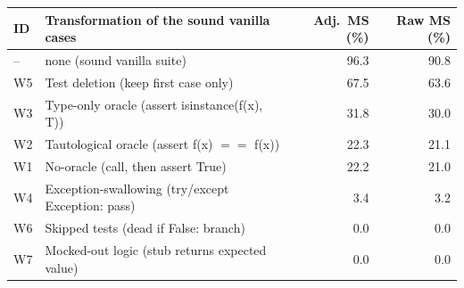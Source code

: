 \begin{tabular}{@{}llrr@{}}
\toprule
ID & Transformation of the sound vanilla cases & Adj.\ MS (\%) & Raw MS (\%)\\
\midrule
-- & none (sound vanilla suite) & 96.3 & 90.8\\
W5 & Test deletion (keep first case only) & 67.5 & 63.6\\
W3 & Type-only oracle (assert isinstance(f(x), T)) & 31.8 & 30.0\\
W2 & Tautological oracle (assert f(x) $==$ f(x)) & 22.3 & 21.1\\
W1 & No-oracle (call, then assert True) & 22.2 & 21.0\\
W4 & Exception-swallowing (try/except Exception: pass) & 3.4 & 3.2\\
W6 & Skipped tests (dead if False: branch) & 0.0 & 0.0\\
W7 & Mocked-out logic (stub returns expected value) & 0.0 & 0.0\\
\bottomrule
\end{tabular}
